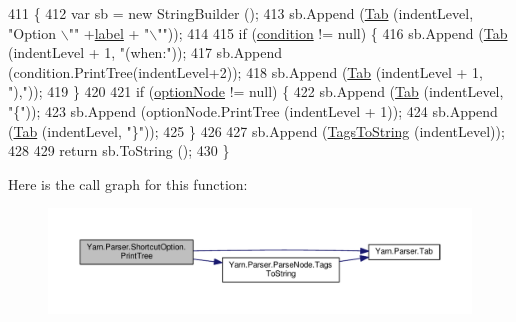 \begin{DoxyCode}
411             \{
412                 var sb = \textcolor{keyword}{new} StringBuilder ();
413                 sb.Append (\hyperlink{a00149_aa8fa36b46de12a1c561d77b99c4b9ae3}{Tab} (indentLevel, \textcolor{stringliteral}{"Option \(\backslash\)""} +\hyperlink{a00159_ab43ec731479a56891389f6ece87f5f62}{label} + \textcolor{stringliteral}{"\(\backslash\)""}));
414 
415                 \textcolor{keywordflow}{if} (\hyperlink{a00159_a31ece7f65af1e43961b68ba0275cdfaf}{condition} != null) \{
416                     sb.Append (\hyperlink{a00149_aa8fa36b46de12a1c561d77b99c4b9ae3}{Tab} (indentLevel + 1, \textcolor{stringliteral}{"(when:"}));
417                     sb.Append (condition.PrintTree(indentLevel+2));
418                     sb.Append (\hyperlink{a00149_aa8fa36b46de12a1c561d77b99c4b9ae3}{Tab} (indentLevel + 1, \textcolor{stringliteral}{"),"}));
419                 \}
420 
421                 \textcolor{keywordflow}{if} (\hyperlink{a00159_a33d667370031f58b054b79a39891c3f3}{optionNode} != null) \{
422                     sb.Append (\hyperlink{a00149_aa8fa36b46de12a1c561d77b99c4b9ae3}{Tab} (indentLevel, \textcolor{stringliteral}{"\{"}));
423                     sb.Append (optionNode.PrintTree (indentLevel + 1));
424                     sb.Append (\hyperlink{a00149_aa8fa36b46de12a1c561d77b99c4b9ae3}{Tab} (indentLevel, \textcolor{stringliteral}{"\}"}));
425                 \}
426 
427                 sb.Append (\hyperlink{a00148_a054f36c80d5eeacd569a8859f599af67}{TagsToString} (indentLevel));
428 
429                 \textcolor{keywordflow}{return} sb.ToString ();
430             \}
\end{DoxyCode}


Here is the call graph for this function\-:
\nopagebreak
\begin{figure}[H]
\begin{center}
\leavevmode
\includegraphics[width=350pt]{a00159_a529a2ef1aa6d7226db4ea7f3ea92b8c2_cgraph}
\end{center}
\end{figure}


